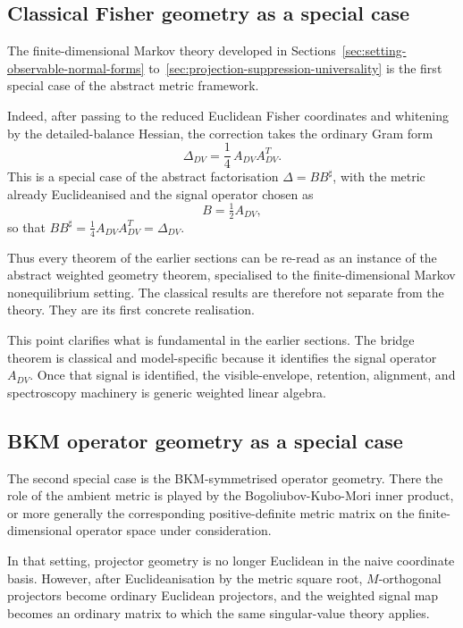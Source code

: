 \documentclass[11pt,a4paper]{article}
\numberwithin{equation}{section}
\theoremstyle{thmcompact}
\theoremstyle{remark}
\begin{document}
\subsection{Classical Fisher geometry as a special case}

The finite-dimensional Markov theory developed in Sections~\ref{sec:setting-observable-normal-forms} to~\ref{sec:projection-suppression-universality} is the first special case of the abstract metric framework.

Indeed, after passing to the reduced Euclidean Fisher coordinates and whitening by the detailed-balance Hessian, the correction takes the ordinary Gram form
\begin{equation}
\Delta_{DV}=\frac14\,A_{DV}A_{DV}^{T}.
\end{equation}
This is a special case of the abstract factorisation \(\Delta=BB^{\sharp}\), with the metric already Euclideanised and the signal operator chosen as
\begin{equation}
B=\tfrac12 A_{DV},
\end{equation}
so that \(BB^{\sharp}=\tfrac14 A_{DV}A_{DV}^T=\Delta_{DV}\).

Thus every theorem of the earlier sections can be re-read as an instance of the abstract weighted geometry theorem, specialised to the finite-dimensional Markov nonequilibrium setting. The classical results are therefore not separate from the theory. They are its first concrete realisation.

This point clarifies what is fundamental in the earlier sections. The bridge theorem is classical and model-specific because it identifies the signal operator \(A_{DV}\). Once that signal is identified, the visible-envelope, retention, alignment, and spectroscopy machinery is generic weighted linear algebra.

\subsection{BKM operator geometry as a special case}

The second special case is the BKM-symmetrised operator geometry. There the role of the ambient metric is played by the Bogoliubov-Kubo-Mori inner product, or more generally the corresponding positive-definite metric matrix on the finite-dimensional operator space under consideration.

In that setting, projector geometry is no longer Euclidean in the naive coordinate basis. However, after Euclideanisation by the metric square root, \(M\)-orthogonal projectors become ordinary Euclidean projectors, and the weighted signal map becomes an ordinary matrix to which the same singular-value theory applies.
\end{document}
